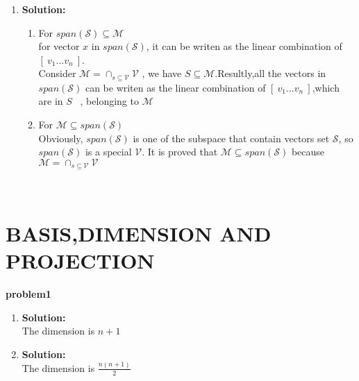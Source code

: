 \documentclass[english,onecolumn,UTF8]{IEEEtran}
\begin{document}
\begin{enumerate}
	
	\item \textbf{Solution:}
	\begin{enumerate}
	\item For $span(\mathcal{S}) \subseteq \mathcal{M}$\\
	for vector $x$ in $span(\mathcal{S})$, it can be writen as the linear combination of $[\ v_{1}...v_{n} \ ]$.\\ Consider $\mathcal{M}=\cap_{s\subseteq\mathcal{V}}\mathcal{V}$ , we have $S \subseteq \mathcal{M} $.Resultly,all the vectors in $span(\mathcal{S})$ can be writen as the linear combination of $[\ v_{1}...v_{n} \ ]$,which are in $S$ \ , belonging to $\mathcal{M}$
	\item For $\mathcal{M}\subseteq span(\mathcal{S})$ \\
	Obviously, $span(\mathcal{S})$ is one of the subspace that contain vectors set $\mathcal{S}$, so $span(\mathcal{S})$ is a special $\mathcal{V}$. It is proved that $\mathcal{M}\subseteq span(\mathcal{S})$ because $\mathcal{M}=\cap_{s\subseteq\mathcal{V}}\mathcal{V}$
	
	\end{enumerate}

\end{enumerate}  
~\\

\section{BASIS,DIMENSION AND PROJECTION}

\textbf{problem1}
\begin{enumerate}
	\item\textbf{Solution:} \\
	The dimension is \(n+1\)
	\item\textbf{Solution:} \\
	 	The dimension is \(\frac{n(n+1)}{2}\)
\end{enumerate}
\end{document}
